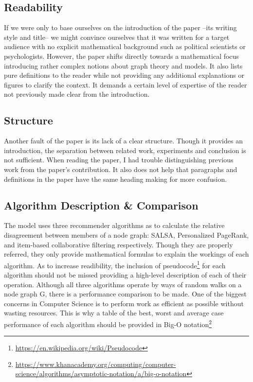 \documentclass[14]{article}
\begin{document}
\subsection{Readability}
If we were only to base ourselves on the introduction of the paper --its writing style and title-- we might convince ourselves that it was written for a target audience with no explicit mathematical background such as political scientists or psychologists. However, the paper shifts directly towards a mathematical focus introducing rather complex notions about graph theory and models. It also lists pure definitions to the reader while not providing any additional explanations or figures to clarify the context. It demands a certain level of expertise of the reader not previously made clear from the introduction. 

\subsection{Structure}
Another fault of the paper is its lack of a clear structure. Though it provides an introduction, the separation between related work, experiments and conclusion is not sufficient. When reading the paper, I had trouble distinguishing previous work from the paper's contribution. It also does not help that paragraphs and definitions in the paper have the same heading making for more confusion.

\subsection{Algorithm Description \& Comparison}
The model uses three recommender algorithms as to calculate the relative disagreement between members of a node graph: SALSA\cite{lempel2001salsa}, Personalized PageRank\cite{page1999pagerank}, and item-based collaborative filtering\cite{linden2003amazon} respectively. Though they are properly referred, they only provide mathematical formulas to explain the workings of each algorithm. As to increase readibility, the inclusion of pseudocode\footnote{\protect\url{https://en.wikipedia.org/wiki/Pseudocode}} for each algorithm should not be missed providing a high-level description of each of their operation.
\newline 
Although all three algorithms operate by ways of random walks on a node graph G, there is a performance comparison to be made. One of the biggest concerns in Computer Science is to perform work as efficient as possible without wasting resources. This is why a table of the best, worst and average case performance of each algorithm should be provided in Big-O notation\footnote{\protect\url{https://www.khanacademy.org/computing/computer-science/algorithms/asymptotic-notation/a/big-o-notation}}
\end{document}
